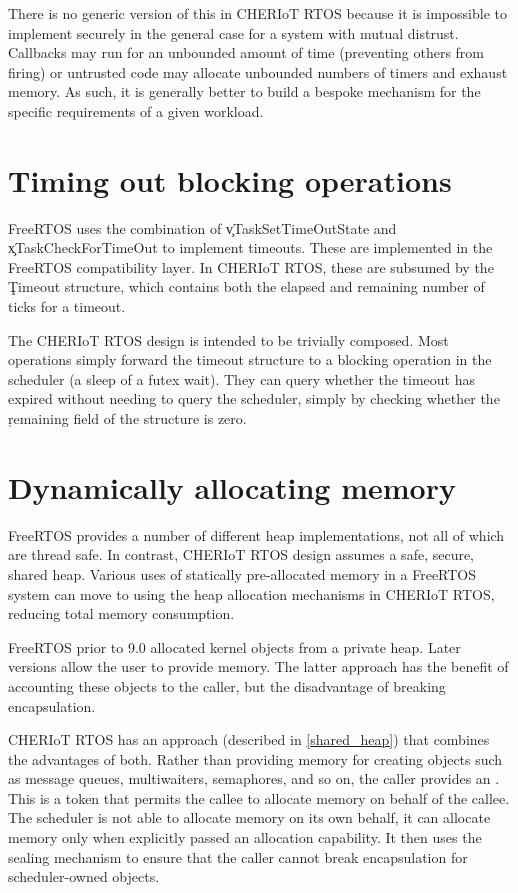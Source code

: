 There is no generic version of this in CHERIoT RTOS because it is impossible to implement securely in the general case for a system with mutual distrust.
Callbacks may run for an unbounded amount of time (preventing others from firing) or untrusted code may allocate unbounded numbers of timers and exhaust memory.
As such, it is generally better to build a bespoke mechanism for the specific requirements of a given workload.

\section{Timing out blocking operations}

FreeRTOS uses the combination of \c{vTaskSetTimeOutState} and \c{xTaskCheckForTimeOut} to implement timeouts.
These are implemented in the FreeRTOS compatibility layer.
In CHERIoT RTOS, these are subsumed by the \c{Timeout} structure, which contains both the elapsed and remaining number of ticks for a timeout.

The CHERIoT RTOS design is intended to be trivially composed.
Most operations simply forward the timeout structure to a blocking operation in the scheduler (a sleep of a futex wait).
They can query whether the timeout has expired without needing to query the scheduler, simply by checking whether the \c{remaining} field of the structure is zero.

\section{Dynamically allocating memory}

FreeRTOS provides a number of different heap implementations, not all of which are thread safe.
In contrast, CHERIoT RTOS design assumes a safe, secure, shared heap.
Various uses of statically pre-allocated memory in a FreeRTOS system can move to using the heap allocation mechanisms in CHERIoT RTOS, reducing total memory consumption.

FreeRTOS prior to 9.0 allocated kernel objects from a private heap.
Later versions allow the user to provide memory.
The latter approach has the benefit of accounting these objects to the caller, but the disadvantage of breaking encapsulation.

CHERIoT RTOS has an approach (described in \ref{shared_heap}) that combines the advantages of both.
Rather than providing memory for creating objects such as message queues, multiwaiters, semaphores, and so on, the caller provides an .
This is a token that permits the callee to allocate memory on behalf of the callee.
The scheduler is not able to allocate memory on its own behalf, it can allocate memory only when explicitly passed an allocation capability.
It then uses the sealing mechanism to ensure that the caller cannot break encapsulation for scheduler-owned objects.

